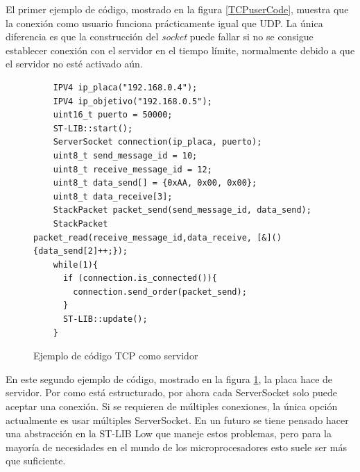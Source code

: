 \documentclass{report}
\begin{document}
\par \vspace{0.3cm}

El primer ejemplo de código, mostrado en la figura \ref{TCPuserCode}, muestra que la conexión como usuario funciona prácticamente igual que UDP. La única diferencia es que la construcción del \textit{socket} puede fallar si no se consigue establecer conexión con el servidor en el tiempo límite, normalmente debido a que el servidor no esté activado aún. 

 \begin{figure}[H]
  \begin{lstlisting}
    IPV4 ip_placa("192.168.0.4");
    IPV4 ip_objetivo("192.168.0.5");
    uint16_t puerto = 50000;
    ST-LIB::start();
    ServerSocket connection(ip_placa, puerto);
    uint8_t send_message_id = 10;
    uint8_t receive_message_id = 12;
    uint8_t data_send[] = {0xAA, 0x00, 0x00}; 
    uint8_t data_receive[3]; 
    StackPacket packet_send(send_message_id, data_send);
    StackPacket packet_read(receive_message_id,data_receive, [&](){data_send[2]++;});
    while(1){
      if (connection.is_connected()){
        connection.send_order(packet_send);
      }
      ST-LIB::update();
    }
  \end{lstlisting}
  \caption{Ejemplo de código TCP como servidor}
  \label{TCPserverCode}
\end{figure}

\par \vspace{0.3cm}

En este segundo ejemplo de código, mostrado en la figura \ref{TCPserverCode}, la placa hace de servidor. Por como está estructurado, por ahora cada ServerSocket solo puede aceptar una conexión. Si se requieren de múltiples conexiones, la única opción actualmente es usar múltiples ServerSocket. En un futuro se tiene pensado hacer una abstracción en la ST-LIB Low que maneje estos problemas, pero para la mayoría de necesidades en el mundo de los microprocesadores esto suele ser más que suficiente. 
\end{document}
